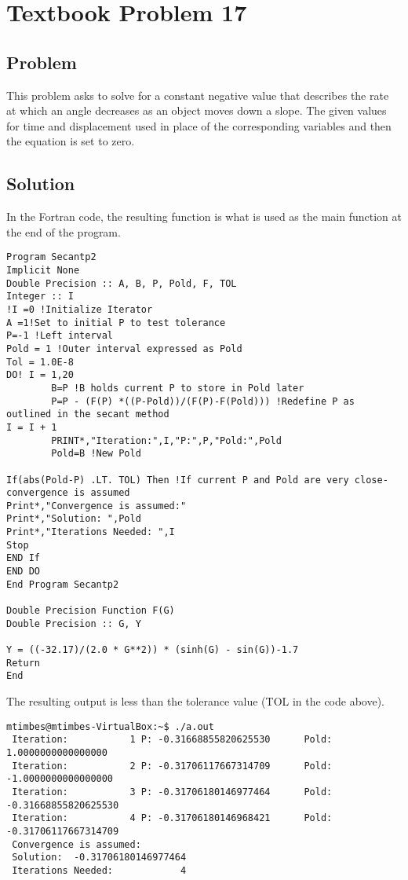 \documentclass[12pt]{article}
\begin{document}
\section{Textbook Problem 17}
\subsection{Problem}
This problem asks to solve for a constant negative value that describes the rate at which an angle decreases as an object moves down a slope. The given values for time and displacement used in place of the corresponding variables and then the equation is set to zero. 
\subsection{Solution}
In the Fortran code, the resulting function is what is used as the main function at the end of the program. 
\begin{lstlisting}[language = FORTRAN]
Program Secantp2
Implicit None
Double Precision :: A, B, P, Pold, F, TOL
Integer :: I
!I =0 !Initialize Iterator
A =1!Set to initial P to test tolerance
P=-1 !Left interval 
Pold = 1 !Outer interval expressed as Pold
Tol = 1.0E-8
DO! I = 1,20 
        B=P !B holds current P to store in Pold later
        P=P - (F(P) *((P-Pold))/(F(P)-F(Pold))) !Redefine P as outlined in the secant method
I = I + 1
        PRINT*,"Iteration:",I,"P:",P,"Pold:",Pold
        Pold=B !New Pold
        
If(abs(Pold-P) .LT. TOL) Then !If current P and Pold are very close- convergence is assumed
Print*,"Convergence is assumed:"
Print*,"Solution: ",Pold
Print*,"Iterations Needed: ",I
Stop
END If
END DO
End Program Secantp2

Double Precision Function F(G)
Double Precision :: G, Y

Y = ((-32.17)/(2.0 * G**2)) * (sinh(G) - sin(G))-1.7
Return
End

\end{lstlisting}
The resulting output is less than the tolerance value (TOL in the code above). 
\begin{verbatim}
mtimbes@mtimbes-VirtualBox:~$ ./a.out
 Iteration:           1 P: -0.31668855820625530      Pold:   1.0000000000000000     
 Iteration:           2 P: -0.31706117667314709      Pold:  -1.0000000000000000     
 Iteration:           3 P: -0.31706180146977464      Pold: -0.31668855820625530     
 Iteration:           4 P: -0.31706180146968421      Pold: -0.31706117667314709     
 Convergence is assumed:
 Solution:  -0.31706180146977464     
 Iterations Needed:            4
\end{verbatim}
\end{document}
